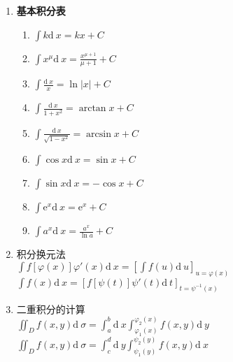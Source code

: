 \documentclass[10pt,a4paper,nofonts]{ctexart}
\renewcommand{\d}{{\mathrm{d}\:\!}}
\newcommand{\e}{{\mathrm{e}}}
\DeclareMathOperator{\sh}{sh}
\DeclareMathOperator{\ch}{ch}
\begin{document}
\begin{multicols}{2}
\begin{enumerate}
\item {\bf 基本积分表}
\begin{enumerate}
\item $\int k\d x=kx+C$
\item $\int x^\mu\d x=\frac{x^{\mu+1}}{\mu+1}+C$
\item $\int \frac{\d x}{x}=\ln |x|+C$
\item $\int \frac{\d x}{1+x^2}=\arctan x+C$
\item $\int \frac{\d x}{\sqrt{1-x^2}}=\arcsin x+C$
\item $\int\cos x\d x=\sin x+C$
\item $\int\sin x\d x=-\cos x+C$
\item $\int\e^x\d x=\e^x+C$
\item $\int a^x\d x=\frac{a^x}{\ln a}+C$
\iffalse
\item $\int\frac{\d x}{x^2+a^2}=\frac{1}{a}\arctan\frac{x}{a}+C$
\item $\int\frac{\d x}{x^2-a^2}=\frac{1}{2a}\ln|\frac{x-a}{x+a}|+C$
\item $\int\frac{\d x}{\sqrt{a^2-x^2}}=\arcsin\frac{x}{a}+C$
\item $\int\frac{\d x}{\sqrt{x^2+a^2}}=\ln(x+\sqrt{x^2+a^2})+C$
\item $\int\frac{\d x}{\sqrt{x^2-a^2}}=\ln|x+\sqrt{x^2-a^2}|+C$
\fi
\end{enumerate}

\item 积分换元法\\
$\int f[\varphi(x)]\varphi'(x)\d x=[\int f(u)\d u]_{u=\varphi(x)}$\\
$\int f(x)\d x=[f[\psi(t)]\psi'(t)\d t]_{t=\psi^{-1}(x)}$

\item 二重积分的计算\\
$\iint_D f(x,y)\d\sigma=\int_a^b\d x\int_{\varphi_1(x)}^{\varphi_2(x)}f(x,y)\d y$\\
$\iint_D f(x,y)\d\sigma=\int_c^d\d y\int_{\psi_1(y)}^{\psi_2(y)}f(x,y)\d x$

\end{enumerate}

\end{multicols}
\end{document}
